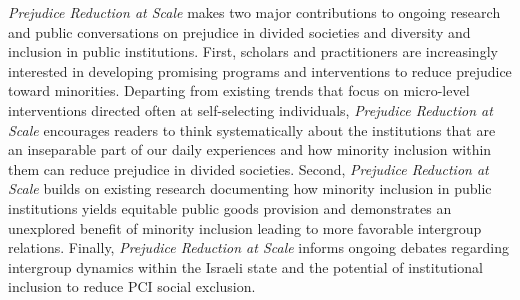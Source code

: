 \documentclass[12pt]{article}
\theoremstyle{plain}
\begin{document}
\emph{Prejudice Reduction at Scale} makes two major contributions to ongoing research and public conversations on prejudice in divided societies and diversity and inclusion in public institutions. First, scholars and practitioners are increasingly interested in developing promising programs and interventions to reduce prejudice toward minorities. Departing from existing trends that focus on micro-level interventions directed often at self-selecting individuals, \emph{Prejudice Reduction at Scale} encourages readers to think systematically about the institutions that are an inseparable part of our daily experiences and how minority inclusion within them can reduce prejudice in divided societies. Second, \emph{Prejudice Reduction at Scale} builds on existing research documenting how minority inclusion in public institutions yields equitable public goods provision and demonstrates an unexplored benefit of minority inclusion leading to more favorable intergroup relations. Finally, \emph{Prejudice Reduction at Scale} informs ongoing debates regarding intergroup dynamics within the Israeli state and the potential of institutional inclusion to reduce PCI social exclusion.
\end{document}
